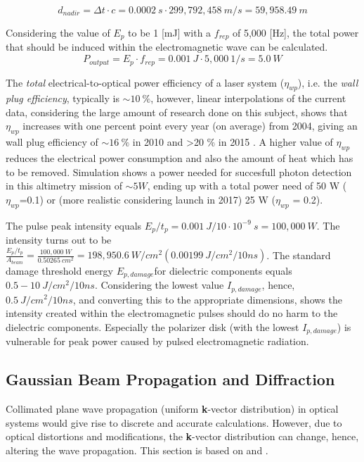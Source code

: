 \begin{equation}
\label{alongtracknadir}
d_{nadir} = \Delta t \cdot c = 0.0002\ s \cdot 299,792,458\ m/s = 59,958.49\ m
\end{equation}

Considering the value of $E_{p}$ to be 1 [mJ] with a $f_{rep}$ of 5,000 [Hz], the total power that should be induced within the electromagnetic wave can be calculated.
\begin{equation}
\label{outputpower}
P_{output} = E_{p} \cdot f_{rep} = 0.001\ J \cdot 5,000\ 1/s = 5.0\ W
\end{equation}

The \textit{total} electrical-to-optical power efficiency of a laser system ($\eta_{wp}$), i.e. the \textit{wall plug efficiency}, typically is $\sim 10\ \%$, however, linear interpolations of the current data, considering the large amount of research done on this subject, shows that $\eta_{wp}$ increases with one percent point every year (on average) from 2004, giving an wall plug efficiency of $\sim16\ \%$ in 2010 and \textgreater20 \% in 2015 \cite{nd_yag_life}. A higher value of $\eta_{wp}$ reduces the electrical power consumption and also the amount of heat which has to be removed. Simulation shows a power needed for succesfull photon detection in this altimetry mission of $\sim5 W$, ending up with a total power need of 50 W ($\eta_{wp}$=0.1) or (more realistic considering launch in 2017) 25 W ($\eta_{wp}$ = 0.2). 
  
The pulse peak intensity equals $E_{p}/t_{p} = 0.001\ J / 10\cdot10^{-9}\ s = 100,000\ W$. The intensity turns out to be $\frac{E_{p}/t_{p}}{A_{beam}} = \frac{100,000\ W}{0.50265\ cm^{2}} = 198,950.6\ W/cm^{2} (0.00199\ J/cm^{2}/10ns)$. The standard damage threshold energy $E_{p,damage}$for dielectric components equals $0.5 - 10\ J/cm^{2}/10ns$. Considering the lowest value $I_{p,damage}$, hence, $0.5\ J/cm^{2}/10ns$, and converting this to the appropriate dimensions, shows the intensity created within the electromagnetic pulses should do no harm to the dielectric components. Especially the polarizer disk (with the lowest $I_{p,damage}$) is vulnerable for peak power caused by pulsed electromagnetic radiation. 

\subsection{Gaussian Beam Propagation and Diffraction}
	\label{diffraction}

\cite{fourieroptics}Collimated plane wave propagation (uniform \textbf{k}-vector distribution) in optical systems would give rise to discrete and accurate calculations. However, due to optical distortions and modifications, the \textbf{k}-vector distribution can change, hence, altering the wave propagation. This section is based on \cite{fourieroptics} and \cite{fourieroptics1}. 

